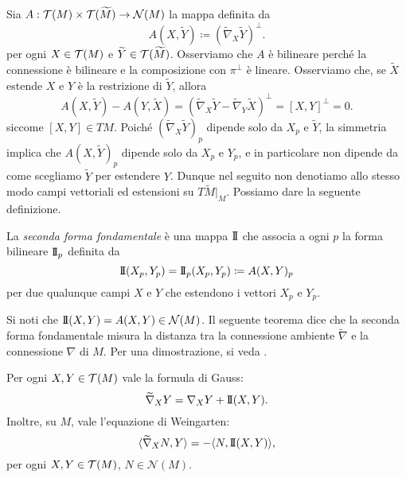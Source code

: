 	Sia \(A:\mathcal{T}(M) \times \mathcal{T}(\widetilde{M}) \to \mathcal{N}(M)\) la mappa definita da
	\[
	A(X,\widetilde{Y}) \coloneq (\widetilde{\nabla}_X \widetilde{Y})^\perp.
	\]
	per ogni \(X \in \mathcal{T}(M)\) e \(\widetilde{Y} \in \mathcal{T}(\widetilde{M})\). Osserviamo che \(A\) è bilineare perché la connessione è bilineare e la composizione con \(\pi^\perp\) è lineare. Osserviamo che, se \(\widetilde{X}\) estende \(X\) e \(Y\) è la restrizione di \(\widetilde{Y}\), allora
	\[
	A(X,\widetilde{Y})-A(Y,\widetilde{X}) = (\widetilde{\nabla}_X \widetilde{Y}-\widetilde{\nabla}_Y\widetilde{X})^\perp =[X,Y]^\perp = 0.
	\]
	siccome \([X,Y] \in TM\). Poiché \((\widetilde{\nabla}_X \widetilde{Y})_p\) dipende solo da \(X_p\) e \(\widetilde{Y}\), la simmetria implica che \(A(X,\widetilde{Y})_p\) dipende solo da \(X_p\) e \(Y_p\), e in particolare non dipende da come scegliamo $\widetilde{Y}$ per estendere \(Y\). Dunque nel seguito non denotiamo allo stesso modo campi vettoriali ed estensioni su \(T\widetilde{M}|_M\). Possiamo dare la seguente definizione.
	\begin{defi}
		La \textit{seconda forma fondamentale} è una mappa \(\mathrm{I\!I}\) che associa a ogni \(p\) la forma bilineare \(\mathrm{I\!I}_p\) definita da
		\[
		\mathrm{I\!I}(X_p,Y_p) = \mathrm{I\!I}_p(X_p,Y_p) \coloneq A(X,Y)_p
		\]
		per due qualunque campi \(X\) e \(Y\) che estendono i vettori \(X_p\) e \(Y_p\). 
	\end{defi}
	
	Si noti che \(\mathrm{I\!I}(X,Y) = A(X,Y) \in \mathcal{N}(M)\). Il seguente teorema dice che la seconda forma fondamentale misura la distanza tra la connessione ambiente \(\widetilde{\nabla}\) e la connessione \(\nabla\) di \(M\). Per una dimostrazione, si veda \cite[Theorem 8.2, Lemma 8.3]{lee1997riemannian}.
	
	\begin{teo}\label{teo: formula Gauss}
		Per ogni \(X,Y \in \mathcal{T}(M)\) vale la \textnormal{formula di Gauss}:
		\begin{equation}\label{eq: formula Gauss}
			\widetilde{\nabla}_{X}Y = \nabla_XY+ \mathrm{I\!I}(X,Y).
		\end{equation}
		Inoltre, su \(M\), vale l'\textnormal{equazione di Weingarten}:
		\begin{equation}\label{eq: Weingarten}
			\langle \widetilde{\nabla}_{X} N, Y \rangle = - \langle N, \mathrm{I\!I}(X,Y) \rangle,
		\end{equation}
		per ogni \(X,Y \in \mathcal{T}(M)\), \(N \in \mathcal{N}(M)\). 
	\end{teo}
	

